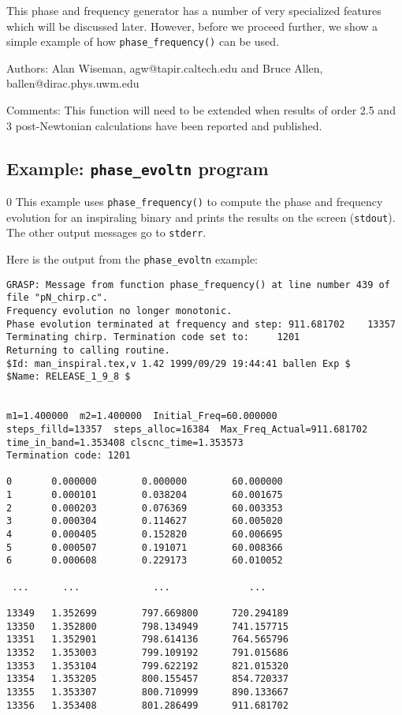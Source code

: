 This phase and frequency generator has a number of very specialized features 
which will be discussed later. 
However,
before we proceed further, we show a simple example of how  
{\tt phase\_frequency()} can be used.

\begin{description}
\item{Authors:} Alan Wiseman, agw@tapir.caltech.edu and Bruce Allen, ballen@dirac.phys.uwm.edu
\item{Comments:}
This function will need to be extended when results of order 2.5 and 3
post-Newtonian calculations have been reported and published.
\end{description}

\clearpage

\subsection{Example: {\tt phase\_evoltn} program}
\label{ss:phase_evoltn}
\setcounter{equation}0
This example uses {\tt phase\_frequency()} to compute the phase and
frequency evolution for an inspiraling binary and prints the results 
on the screen ({\tt stdout}). 
The other output messages go to {\tt stderr}.
\clearpage

Here is the output from the {\tt phase\_evoltn} example:

{\footnotesize
\begin{verbatim}
GRASP: Message from function phase_frequency() at line number 439 of file "pN_chirp.c".
Frequency evolution no longer monotonic.
Phase evolution terminated at frequency and step: 911.681702    13357
Terminating chirp. Termination code set to:     1201
Returning to calling routine.
$Id: man_inspiral.tex,v 1.42 1999/09/29 19:44:41 ballen Exp $
$Name: RELEASE_1_9_8 $


m1=1.400000  m2=1.400000  Initial_Freq=60.000000
steps_filld=13357  steps_alloc=16384  Max_Freq_Actual=911.681702
time_in_band=1.353408 clscnc_time=1.353573
Termination code: 1201

0       0.000000        0.000000        60.000000
1       0.000101        0.038204        60.001675
2       0.000203        0.076369        60.003353
3       0.000304        0.114627        60.005020
4       0.000405        0.152820        60.006695
5       0.000507        0.191071        60.008366
6       0.000608        0.229173        60.010052

 ...      ...             ...              ...

13349   1.352699        797.669800      720.294189
13350   1.352800        798.134949      741.157715
13351   1.352901        798.614136      764.565796
13352   1.353003        799.109192      791.015686
13353   1.353104        799.622192      821.015320
13354   1.353205        800.155457      854.720337
13355   1.353307        800.710999      890.133667
13356   1.353408        801.286499      911.681702
\end{verbatim}
}

